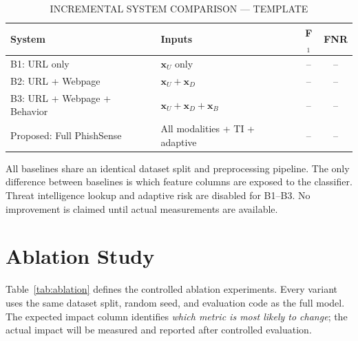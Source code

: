 \documentclass[conference]{IEEEtran}
\begin{document}
\begin{table}[!t]
\caption{INCREMENTAL SYSTEM COMPARISON --- TEMPLATE}
\label{tab:baseline}
\centering
\scriptsize
\setlength{\tabcolsep}{3pt}
\begin{tabularx}{\columnwidth}{|>{\raggedright\arraybackslash}p{}|>{\raggedright\arraybackslash}X|c|c|}
\hline
\textbf{System} & \textbf{Inputs} & \textbf{F$_1$} & \textbf{FNR} \\ \hline
B1: URL only                         & $\mathbf{x}_U$ only          & -- & -- \\ \hline
B2: URL + Webpage                    & $\mathbf{x}_U + \mathbf{x}_D$ & -- & -- \\ \hline
B3: URL + Webpage + Behavior         & $\mathbf{x}_U+\mathbf{x}_D+\mathbf{x}_B$ & -- & -- \\ \hline
Proposed: Full PhishSense            & All modalities + TI + adaptive & -- & -- \\ \hline
\end{tabularx}
\end{table}

All baselines share an identical dataset split and preprocessing pipeline.
The only difference between baselines is which feature columns are exposed to the classifier.
Threat intelligence lookup and adaptive risk are disabled for B1--B3.
No improvement is claimed until actual measurements are available.

\section{Ablation Study}

Table~\ref{tab:ablation} defines the controlled ablation experiments.
Every variant uses the same dataset split, random seed, and evaluation code as the full model.
The expected impact column identifies \textit{which metric is most likely to change}; the actual
impact will be measured and reported after controlled evaluation.
\end{document}
